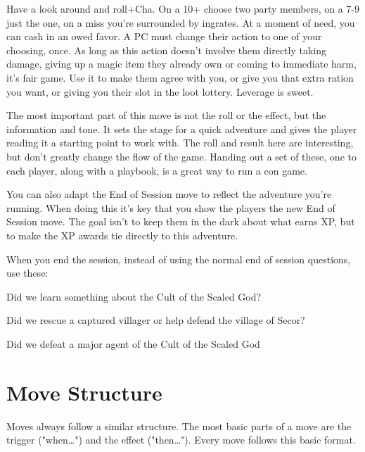 \startExample
Have a look around and roll+Cha. On a 10+ choose two party members, on a 7-9 just the one, on a miss you’re surrounded by ingrates. At a moment of need, you can cash in an owed favor. A PC must change their action to one of your choosing, once. As long as this action doesn’t involve them directly taking damage, giving up a magic item they already own or coming to immediate harm, it’s fair game. Use it to make them agree with you, or give you that extra ration you want, or giving you their slot in the loot lottery. Leverage is sweet.
\stopExample
 

The most important part of this move is not the roll or the effect, but the information and tone. It sets the stage for a quick adventure and gives the player reading it a starting point to work with. The roll and result here are interesting, but don't greatly change the flow of the game. Handing out a set of these, one to each player, along with a playbook, is a great way to run a con game.

 

You can also adapt the End of Session move to reflect the adventure you're running. When doing this it's key that you show the players the new End of Session move. The goal isn't to keep them in the dark about what earns XP, but to make the XP awards tie directly to this adventure.

 
\startExample
When you end the session, instead of using the normal end of session questions, use these:
\stopExample
 
\startitemize[1,packed]

\item Did we learn something about the Cult of the Scaled God?

 
\item Did we rescue a captured villager or help defend the village of Secor?

 
\item Did we defeat a major agent of the Cult of the Scaled God


\stopitemize
 
\section{Move Structure}    
 

Moves always follow a similar structure. The most basic parts of a move are the trigger ("when…") and the effect ("then…"). Every move follows this basic format.

